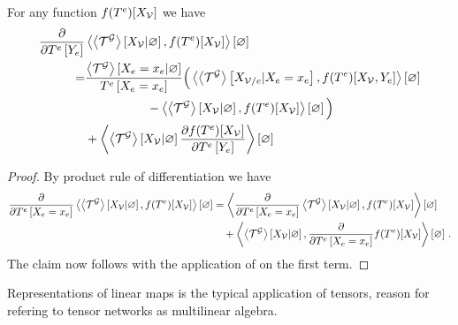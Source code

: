 \begin{lemma}
    \label{lem:difMNExpectation}
    For any function $f(T^{e})[X_{\mathcal{V}}]$ we have
    \begin{align*}
        \frac{\partial }{\partial T^{e}\left[Y_{e}\right]} &
        \left\langle \left\langle \mathcal{T}^{\mathcal{G}}\right\rangle \left[ X_{\mathcal{V}} | \varnothing \right],f(T^{e})[X_{\mathcal{V}}]\right\rangle \left[ \varnothing \right] \\
        = &
        \frac{\left\langle \mathcal{T}^{\mathcal{G}}\right\rangle \left[ X_{e}=x_{e} | \varnothing \right]}{T^{e}\left[X_{e}=x_{e}\right]}
        \Big( \left\langle \left\langle \mathcal{T}^{\mathcal{G}}\right\rangle \left[ X_{\mathcal{V}/e} | X_{e}=x_{e} \right], f(T^{e})[X_{\mathcal{V}},Y_{e}]\right\rangle \left[ \varnothing \right] \\
        & \quad \quad \quad \quad \quad - \left\langle \left\langle \mathcal{T}^{\mathcal{G}}\right\rangle \left[ X_{\mathcal{V}} | \varnothing \right], f(T^{e})[X_{\mathcal{V}}]\right\rangle \left[ \varnothing \right]
        \Big) \\
        & + \left\langle  \left\langle \mathcal{T}^{\mathcal{G}}\right\rangle \left[ X_{\mathcal{V}} | \varnothing \right]
        \frac{\partial f(T^{e})[X_{\mathcal{V}}]}{\partial T^{e}\left[Y_{e}\right]}
        \right\rangle \left[ \varnothing \right]
    \end{align*}
\end{lemma}
\begin{proof}
    By product rule of differentiation we have
    \begin{align*}
        \frac{\partial }{\partial T^{e}\left[X_{e}=x_{e}\right]} \left\langle \left\langle \mathcal{T}^{\mathcal{G}}\right\rangle \left[ X_{\mathcal{V}} | \varnothing \right],f(T^{e})[X_{\mathcal{V}}]\right\rangle \left[ \varnothing \right]
        & =  \left\langle \frac{\partial }{\partial T^{e}\left[X_{e}=x_{e}\right]}\left\langle \mathcal{T}^{\mathcal{G}}\right\rangle \left[ X_{\mathcal{V}} | \varnothing \right],f(T^{e})[X_{\mathcal{V}}]\right\rangle \left[ \varnothing \right] \\
        & \quad +  \left\langle \left\langle \mathcal{T}^{\mathcal{G}}\right\rangle \left[ X_{\mathcal{V}} | \varnothing \right],\frac{\partial }{\partial T^{e}\left[X_{e}=x_{e}\right]}f(T^{e})[X_{\mathcal{V}}]\right\rangle \left[ \varnothing \right]  \, .
    \end{align*}
    The claim now follows with the application of  on the first term.
\end{proof}


Representations of linear maps is the typical application of tensors, reason for refering to tensor networks as multilinear algebra.
